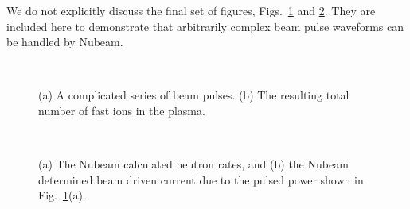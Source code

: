    We do not explicitly discuss the final set of
   figures, Figs.~\ref{Fig5} and \ref{Fig6}. They are included here to
   demonstrate that arbitrarily complex beam pulse waveforms can be
   handled by Nubeam. 
 \begin{figure} %
 \centering 
 \begin{narrow}{-.50in}{0in}   
   \mbox{
     }
   \mbox{  {}}
\end{narrow}
 \caption{(a) A complicated series of beam pulses. (b) The resulting
   total number of fast ions in the plasma.}
  \label{Fig5}
 \end{figure}
 \begin{figure} %
 \centering 
 \begin{narrow}{-.50in}{0in}   
   \mbox{
     }
   \mbox{  {}}
\end{narrow}
 \caption{(a) The Nubeam calculated neutron rates,  and (b) the Nubeam
   determined beam driven current due to the pulsed power shown in Fig.~\ref{Fig5}(a). }
  \label{Fig6}
 \end{figure}

